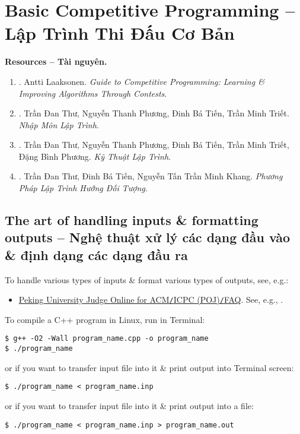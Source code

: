 \documentclass{article}
\begin{document}

\section{Basic Competitive Programming -- Lập Trình Thi Đấu Cơ Bản}
\textbf{\textsf{Resources -- Tài nguyên.}}
\begin{enumerate}
	\item \cite{Laaksonen2020}. {\sc Antti Laaksonen}. {\it Guide to Competitive Programming: Learning \& Improving Algorithms Through Contests}.
	\item \cite{Thu_Phuong_Tien_Triet_NMLT}. {\sc Trần Đan Thư, Nguyễn Thanh Phương, Đinh Bá Tiến, Trần Minh Triết}. {\it Nhập Môn Lập Trình}.
	\item \cite{Thu_Phuong_Tien_Triet_Phuong_KTLT}. {\sc Trần Đan Thư, Nguyễn Thanh Phương, Đinh Bá Tiến, Trần Minh Triết, Đặng Bình Phương}. {\it Kỹ Thuật Lập Trình}.
	\item \cite{Thu_Tien_Khang_PPLTHDT}. {\sc Trần Đan Thư, Đinh Bá Tiến, Nguyễn Tấn Trần Minh Khang}. {\it Phương Pháp Lập Trình Hướng Đối Tượng}.
\end{enumerate}

\subsection{The art of handling inputs \& formatting outputs -- Nghệ thuật xử lý các dạng đầu vào \& định dạng các dạng đầu ra}
To handle various types of inputs \& format various types of outputs, see, e.g.:
\begin{itemize}
	\item \href{http://poj.org/faq.htm}{Peking University Judge Online for ACM{\tt/}ICPC (POJ){\tt/}FAQ}.
	See, e.g., \cite[Chap. 2, Subsect. 2.1.1, pp. 10--11]{Laaksonen2020, Laaksonen2024}.
\end{itemize}
To compile a C++ program in Linux, run in Terminal:
\begin{verbatim}
$ g++ -O2 -Wall program_name.cpp -o program_name
$ ./program_name
\end{verbatim}
or if you want to transfer input file into it \& print output into Terminal screen:
\begin{verbatim}
$ ./program_name < program_name.inp
\end{verbatim}
or if you want to transfer input file into it \& print output into a file:
\begin{verbatim}
$ ./program_name < program_name.inp > program_name.out
\end{verbatim}
\end{document}
